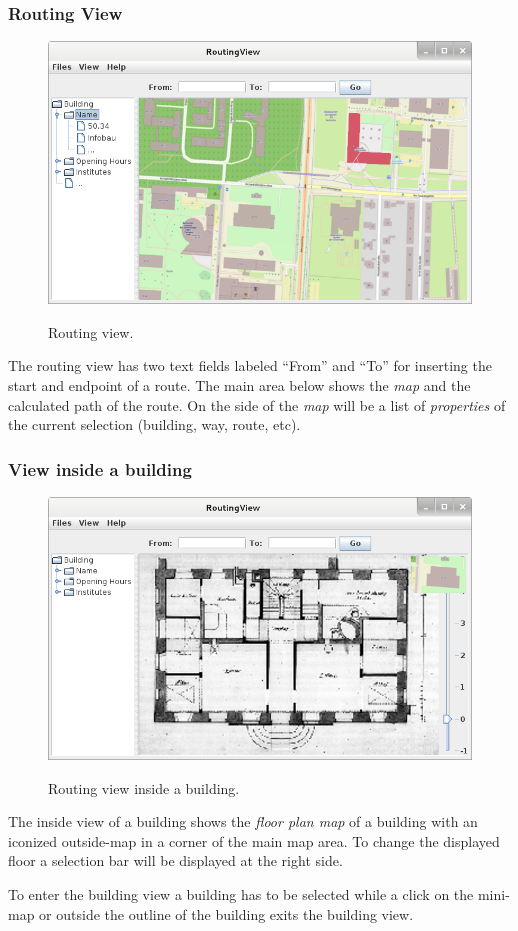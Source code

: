 \subsubsection*{Routing View}
\begin{figure}[!h]
	\centering
	\includegraphics[scale=0.55]{gui-pictures/RoutingView.png} \\
	\caption{Routing view.}
\end{figure}
The routing view has two text fields labeled ``From'' and ``To'' for inserting
the start and endpoint of a route. The main area below shows the \textit{map} and the
calculated path of the route.
On the side of the \textit{map} will be a list of \textit{properties} of the current selection
(building, way, route, etc).

\newpage

\subsubsection*{View inside a building}
\begin{figure}[!h]
	\centering
	\includegraphics[scale=0.55]{gui-pictures/RoutingView_inside.png} \\
	\caption{Routing view inside a building.}
\end{figure}
The inside view of a building shows the \textit{floor plan map} of a building with an iconized
outside-map in a corner of the main map area. To change the displayed floor a
selection bar will be displayed at the right side.

To enter the building view a building has to be selected while a click on the mini-map or outside the outline of the building exits the building view.

